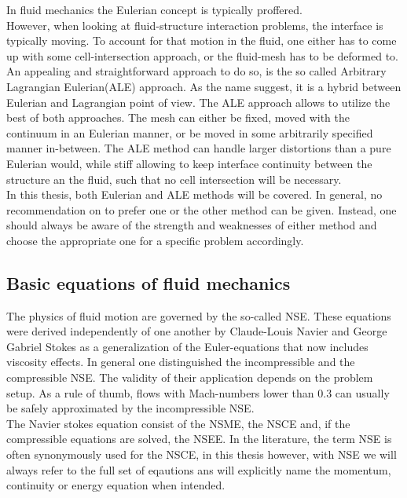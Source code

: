 \documentclass[../main.tex]{subfiles}
\begin{document}
In fluid mechanics the Eulerian concept is typically proffered.\\
However, when looking at fluid-structure interaction problems, the interface is typically moving. To account for that motion in the fluid, one either has to come up with some cell-intersection approach, or the fluid-mesh has to be deformed to.\\
An appealing and straightforward approach to do so, is the so called Arbitrary Lagrangian Eulerian(\ac{ALE}) approach. As the name suggest, it is a hybrid between Eulerian and Lagrangian point of view. The \ac{ALE} approach allows to utilize the best of both approaches. The mesh can either be fixed, moved with the continuum in an Eulerian manner, or be moved in some arbitrarily specified manner in-between. The \ac{ALE} method can handle larger distortions than a pure Eulerian would, while stiff allowing to keep interface continuity between the structure an the fluid, such that no cell intersection will be necessary.\\
In this thesis, both Eulerian and \ac{ALE} methods will be covered. In general, no recommendation on to prefer one or the other method can be given. Instead, one should always be aware of the strength and weaknesses of either method and choose the appropriate one for a specific problem accordingly.


\subsection{Basic equations of fluid mechanics}\label{sec:fluid_equations_basic}

The physics of fluid motion are governed by the so-called \acf{NSE}. These equations were derived independently of one another by Claude-Louis Navier and George Gabriel Stokes as a generalization of the Euler-equations that now includes viscosity effects.
In general one distinguished the incompressible and the compressible \ac{NSE}. The validity of their application depends on the problem setup. As a rule of thumb, flows with Mach-numbers lower than $0.3$ can usually be safely approximated by the incompressible \ac{NSE}.\\
The Navier stokes equation consist of the \acf{NSME}, the \ac{NSCE} and, if the compressible equations are solved, the \ac{NSEE}. In the literature, the term \ac{NSE} is often synonymously used for the \ac{NSCE}, in this thesis however, with \ac{NSE} we will always refer to the full set of eqautions ans will explicitly name the momentum, continuity or energy equation when intended.
\end{document}
